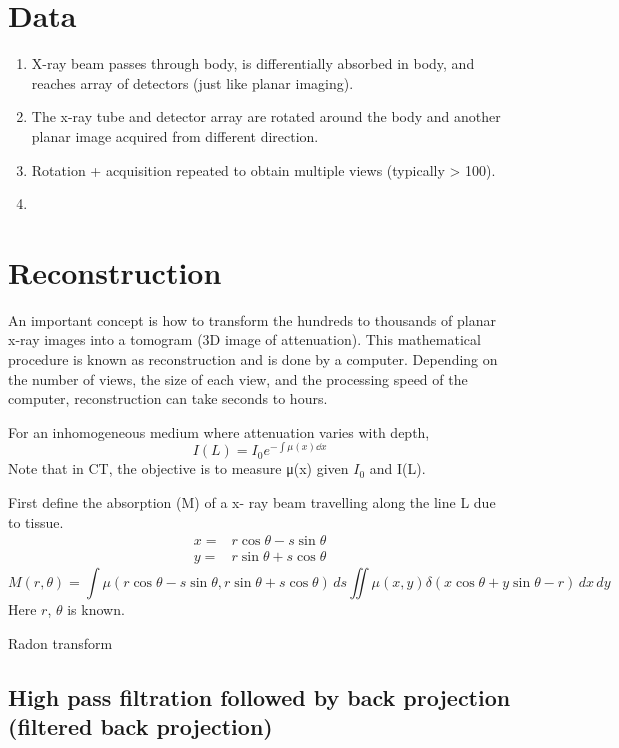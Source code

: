\documentclass[UTF8,a4paper,11pt]{book}
\theoremstyle{mystyle}{
  \newtheorem{example}{Example}
}
\begin{document}
\section{Data }
\begin{enumerate}
\item X-ray beam passes through body, is differentially absorbed in body, and reaches array of detectors (just like planar imaging).
\item The x-ray tube and detector array are rotated around the body and another planar image acquired from different direction.
\item Rotation + acquisition repeated to obtain multiple views (typically > 100).
\item
\end{enumerate}

\section{Reconstruction}
An important concept is how to transform the hundreds to thousands of planar x-ray images into a tomogram (3D image of attenuation).
This mathematical procedure is known as reconstruction and is done by a computer.
Depending on the number of views, the size of each view, and the processing speed of the computer, reconstruction can take seconds to hours.

For an inhomogeneous medium where attenuation varies with depth,
\begin{equation}
I(L)=I_0 e^{-\int \mu(x)\dd{x}}
\end{equation}
Note that in CT, the objective is to measure μ(x) given $I_0$ and I(L).


First define the
absorption (M) of a x-
ray beam travelling
along the line L due to
tissue.
\begin{align*}
x = & r \cos{\theta} - s \sin\theta  \\
y = & r \sin\theta  +  s\cos\theta
\end{align*}
\begin{equation}
M (r,\theta) = \int \mu(r\cos\theta-s \sin\theta,r\sin\theta+s\cos\theta)\,d s
 \iint \mu(x,y) \delta (x\cos\theta+y\sin\theta-r)\,dx\,dy
\end{equation}
Here $r$, $\theta$ is known.

Radon transform 

\subsection{ High pass filtration
followed by back
projection (filtered back
projection)}
\end{document}
